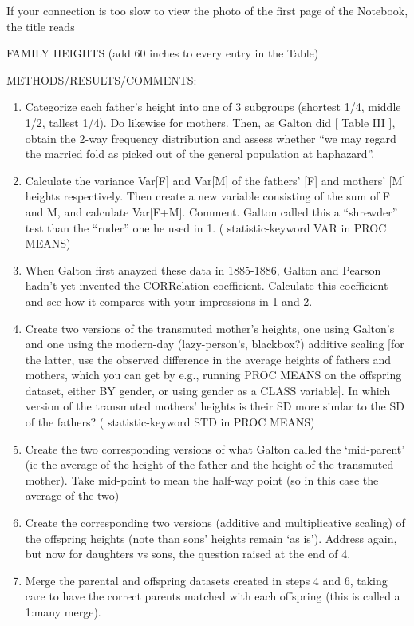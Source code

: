 \documentclass[]{book}
\begin{document}
If your connection is too slow to view the photo of the first page of the Notebook, the title reads

FAMILY HEIGHTS
(add 60 inches to every entry in the Table)

METHODS/RESULTS/COMMENTS:

\begin{enumerate}
\def\labelenumi{\arabic{enumi}.}
\item
  Categorize each father's height into one of 3 subgroups (shortest 1/4, middle 1/2, tallest 1/4). Do likewise for mothers. Then, as Galton did {[} Table III {]}, obtain the 2-way frequency distribution and assess whether ``we may regard the married fold as picked out of the general population at haphazard''.
\item
  Calculate the variance Var{[}F{]} and Var{[}M{]} of the fathers' {[}F{]} and mothers' {[}M{]} heights respectively. Then create a new variable consisting of the sum of F and M, and calculate Var{[}F+M{]}. Comment. Galton called this a ``shrewder'' test than the ``ruder'' one he used in 1. ( statistic-keyword VAR in PROC MEANS)
\item
  When Galton first anayzed these data in 1885-1886, Galton and Pearson hadn't yet invented the CORRelation coefficient. Calculate this coefficient and see how it compares with your impressions in 1 and 2.
\item
  Create two versions of the transmuted mother's heights, one using Galton's and one using the modern-day (lazy-person's, blackbox?) additive scaling {[}for the latter, use the observed difference in the average heights of fathers and mothers, which you can get by e.g., running PROC MEANS on the offspring dataset, either BY gender, or using gender as a CLASS variable{]}. In which version of the transmuted mothers' heights is their SD more simlar to the SD of the fathers? ( statistic-keyword STD in PROC MEANS)
\item
  Create the two corresponding versions of what Galton called the `mid-parent' (ie the average of the height of the father and the height of the transmuted mother). Take mid-point to mean the half-way point (so in this case the average of the two)
\item
  Create the corresponding two versions (additive and multiplicative scaling) of the offspring heights (note than sons' heights remain `as is'). Address again, but now for daughters vs sons, the question raised at the end of 4.
\item
  Merge the parental and offspring datasets created in steps 4 and 6, taking care to have the correct parents matched with each offspring (this is called a 1:many merge).

\end{enumerate}
\end{document}
